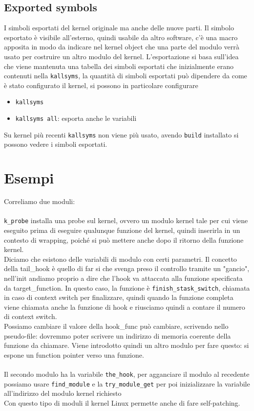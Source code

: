 \documentclass[12pt, oneside]{extbook}
\begin{document}
\subsection{Exported symbols}
I simboli esportati del kernel originale ma anche delle nuove parti. Il simbolo esportato è visibile all'esterno, quindi usabile da altro software, c'è una macro apposita in modo da indicare nel kernel object che una parte del modulo verrà usato per costruire un altro modulo del kernel. L'esportazione si basa sull'idea che viene mantenuta una tabella dei simboli esportati che inizialmente erano contenuti nella \texttt{kallsyms}, la quantità di simboli esportati può dipendere da come è stato configurato il kernel, si possono in particolare configurare
\begin{itemize}
\item \texttt{kallsyms}
\item \texttt{kallsyms all}: esporta anche le variabili
\end{itemize}
Su kernel più recenti \texttt{kallsyms} non viene più usato, avendo \texttt{build} installato si possono vedere i simboli esportati.\\
\section*{Esempi}
Correliamo due moduli:\\\\\texttt{k\_probe} installa una probe sul kernel, ovvero un modulo kernel tale per cui viene eseguito prima di eseguire qualunque funzione del kernel, quindi inserirla in un contesto di wrapping, poiché si può mettere anche dopo il ritorno della funzione kernel.\\ Diciamo che esistono delle variabili di modulo con certi parametri. Il concetto della tail\_hook è quello di far si che svenga preso il controllo tramite un "gancio", nell'init andiamo proprio a dire che l'hook va attaccata alla funzione specificata da target\_function. In questo caso, la funzione è \texttt{finish\_stask\_switch}, chiamata in caso di context switch per finalizzare, quindi quando la funzione completa viene chiamata anche la funzione di hook e riusciamo quindi a contare il numero di context switch.\\Possiamo cambiare il valore della hook\_func può cambiare, scrivendo nello pseudo-file: dovremmo poter scrivere un indirizzo di memoria coerente della funzione da chiamare. Viene introdotto quindi un altro modulo per fare questo: si espone un function pointer verso una funzione.\\\\Il secondo modulo ha la variabile \texttt{the\_hook}, per agganciare il modulo al recedente possiamo usare \texttt{find\_module} e la \texttt{try\_module\_get} per poi inizializzare la variabile all'indirizzo del modulo kernel richiesto\\Con questo tipo di moduli il kernel Linux permette anche di fare self-patching.
\end{document}
